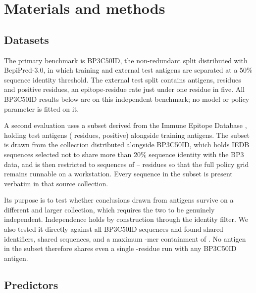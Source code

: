 \section{Materials and methods}
\label{sec:methods}

\subsection{Datasets}
\label{sec:datasets}

The primary benchmark is BP3C50ID, the non-redundant split distributed with
BepiPred-3.0, in which training and external test antigens are separated at a
50\% sequence identity threshold. The external test split contains \BepipredNumAntigens{} antigens,
\BepipredResidues{} residues and \BepipredPositives{} positive residues, an
epitope-residue rate just under one residue in five. All BP3C50ID results below
are on this independent benchmark; no model or policy parameter is fitted on
it.

A second evaluation uses a subset derived from the Immune Epitope Database
\citep{vita2024iedb}, holding \IedbSubsetTest{} test antigens
(\NestedIedbResidues{} residues, \NestedIedbPositives{} positive) alongside
\IedbSubsetTrain{} training antigens. The subset is drawn from the
\texttt{\IedbSourceFile{}} collection distributed alongside BP3C50ID, which
holds \IedbSourceSequences{} IEDB sequences selected not to share more than
20\% sequence identity with the BP3 data, and is then restricted to sequences of
\IedbLengthMin{}--\IedbLengthMax{} residues so that the full policy grid remains
runnable on a workstation. Every sequence in the subset is present verbatim in
that source collection.

Its purpose is to test whether conclusions drawn from \BepipredNumAntigens{}
antigens survive on a different and larger collection, which requires the two
to be genuinely independent. Independence holds by construction through the
identity filter. We also tested it directly against all
\IedbBpThreeCompared{} BP3C50ID sequences and found \IedbIdOverlap{} shared
identifiers, \IedbExactOverlap{} shared sequences, and a maximum
\IedbKmerSize{}-mer containment of \IedbMaxContainment{}. No antigen in the
subset therefore shares even a single \IedbKmerSize{}-residue run with any
BP3C50ID antigen.

\subsection{Predictors}
\label{sec:predictors}

